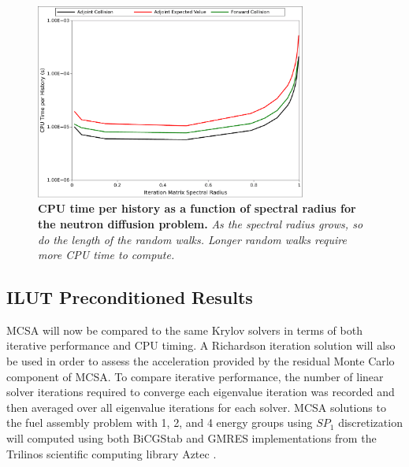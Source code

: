 \documentclass[letterpaper,12pt]{article}
\begin{document}
\begin{figure}[t!]
  \begin{center}
    \includegraphics[width=3.5in]{breakdown_time.pdf}
  \end{center}
  \caption{\textbf{CPU time per history as a function of spectral
      radius for the neutron diffusion problem.} \textit{As the
      spectral radius grows, so do the length of the random
      walks. Longer random walks require more CPU time to compute.}}
  \label{fig:breakdown_time}
\end{figure}

\subsection{ILUT Preconditioned Results}
\label{subsec:spn_comparison}
MCSA will now be compared to the same Krylov solvers in terms of both
iterative performance and CPU timing. A Richardson iteration solution
will also be used in order to assess the acceleration provided by the
residual Monte Carlo component of MCSA.  To compare iterative
performance, the number of linear solver iterations required to
converge each eigenvalue iteration was recorded and then averaged over
all eigenvalue iterations for each solver. MCSA solutions to the fuel
assembly problem with 1, 2, and 4 energy groups using $SP_1$
discretization will computed using both BiCGStab and GMRES
implementations from the Trilinos scientific computing library Aztec
\cite{heroux_overview_2005}.
\end{document}
